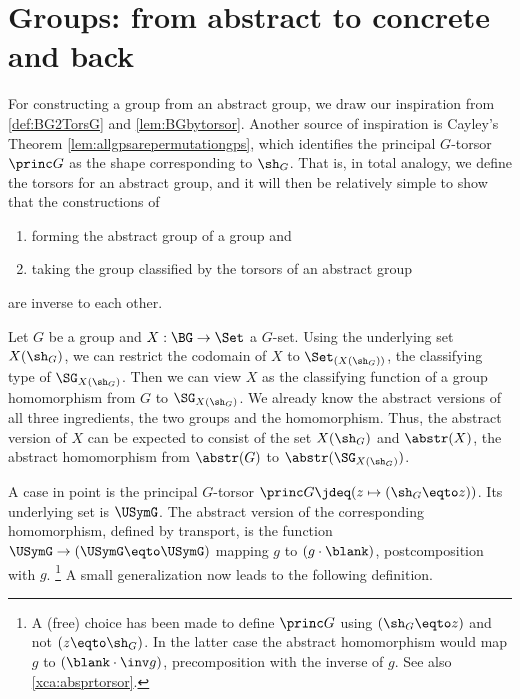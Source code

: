 \section{Groups: from abstract to concrete and back}
\label{sec:Gsetforabstract}

For constructing a group from an abstract group, we draw our inspiration
from \cref{def:BG2TorsG} and \cref{lem:BGbytorsor}. Another source of
inspiration is Cayley's Theorem \cref{lem:allgpsarepermutationgps},
which identifies the principal $G$-torsor $\princ G$ as the shape 
corresponding to $\sh_G$.
That is, in total analogy, we define the torsors for an abstract group,
and it will then be relatively simple to show that the constructions of
\begin{enumerate}
\item forming the abstract group of a group and
\item taking the group classified by the torsors of an abstract group
\end{enumerate}
 are inverse to each other.

Let $G$ be a group and $X:\BG\to\Set$ a $G$-set. Using the
underlying set $X(\sh_G)$, we can restrict the
codomain of $X$ to $\Set_{(X(\sh_G))}$, the classifying type of 
$\SG_{X(\sh_G)}$. Then we can view $X$ as the classifying function of 
a group homomorphism from $G$ to $\SG_{X(\sh_G)}$.
We already know the abstract versions of all three ingredients,
the two groups and the homomorphism. Thus, the abstract version
of $X$ can be expected to consist of the set $X(\sh_G)$ and 
$\abstr(X)$, the abstract homomorphism from $\abstr(G)$ 
to $\abstr(\SG_{X(\sh_G)})$.

A case in point is the principal $G$-torsor $\princ G \jdeq
(z\mapsto (\sh_G\eqto z))$. Its underlying set is $\USymG$.
The abstract version of the corresponding homomorphism,
defined by transport, is the function $\USymG\to(\USymG\eqto\USymG)$
mapping $g$ to $(g\cdot\blank)$, \ie postcomposition with $g$.%
\footnote{\label{ft:choicePshG}A (free) choice has been made to define 
$\princ G$ using $(\sh_G\eqto z)$ and not $(z\eqto\sh_G)$. In the latter
case the abstract homomorphism would map $g$ to $(\blank\cdot\inv g)$, \ie
precomposition with the inverse of $g$. See also \cref{xca:absprtorsor}.}
A small generalization now leads to the following definition.

